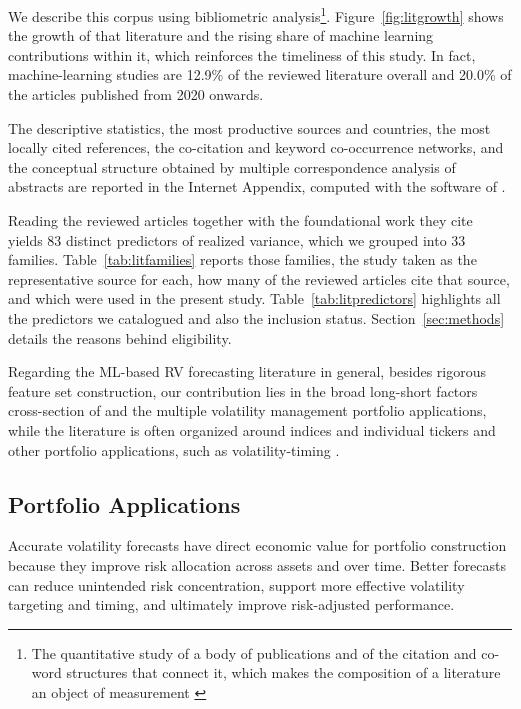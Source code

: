 \documentclass[preprint,12pt,authoryear]{elsarticle}
\begin{document}
We describe this corpus using bibliometric analysis\footnote{The quantitative study of a body of publications and of the citation and co-word structures that connect it, which makes the composition of a literature an object of measurement \citep{donthu2021}}. Figure~\ref{fig:litgrowth} shows the growth of that literature and the rising share of machine learning contributions within it, which reinforces the timeliness of this study. In fact, machine-learning studies are 12.9\% of the reviewed literature overall and 20.0\% of the articles published from 2020 onwards.

 The descriptive statistics, the most productive sources and countries, the most locally cited references, the co-citation and keyword co-occurrence networks, and the conceptual structure obtained by multiple correspondence analysis of abstracts are reported in the Internet Appendix, computed with the software of \citet{ariacuccurullo2017}. 
 
 Reading the reviewed articles together with the foundational work they cite yields 83 distinct predictors of realized variance, which we grouped into 33 families.  Table~\ref{tab:litfamilies} reports those families, the study taken as the representative source for each, how many of the reviewed articles cite that source, and which were used in the present study. Table~\ref{tab:litpredictors} highlights all the predictors we catalogued and also the inclusion status. Section~\ref{sec:methods} details the reasons behind eligibility. 
 
Regarding the ML-based RV forecasting literature in general, besides rigorous feature set construction, our contribution lies in the broad long-short factors cross-section of \citet{jensenkellypedersen2023} and the multiple volatility management portfolio applications, while the literature is often organized around indices and individual tickers and other portfolio applications, such as volatility-timing \citep{ rahimikiapoon2026, brancorubesamzevallos2024, diazhansencabrera2024, chunchoryu2025}.


\subsection{Portfolio Applications}

Accurate volatility forecasts have direct economic value for portfolio construction because they improve risk allocation across assets and over time. Better forecasts can reduce unintended risk concentration, support more effective volatility targeting and timing, and ultimately improve risk-adjusted performance.
\end{document}
